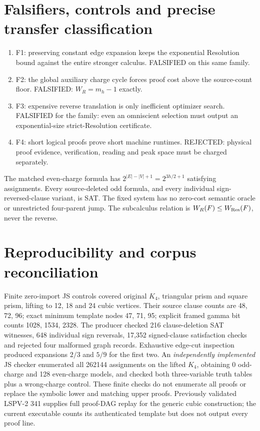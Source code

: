 \documentclass[11pt]{article}
\begin{document}
\section*{Falsifiers, controls and precise transfer classification}
\begin{enumerate}
\item[] F1: preserving constant edge expansion keeps the exponential Resolution bound against the entire stronger calculus. FALSIFIED on this same family.
\item[] F2: the global auxiliary charge cycle forces proof cost above the source-count floor. FALSIFIED: $W_R=m_h-1$ exactly.
\item[] F3: expensive reverse translation is only inefficient optimizer search. FALSIFIED for the family: even an omniscient selection must output an exponential-size strict-Resolution certificate.
\item[] F4: short logical proofs prove short machine runtimes. REJECTED: physical proof evidence, verification, reading and peak space must be charged separately.
\end{enumerate}
The matched even-charge formula has $2^{|E|-|V|+1}=2^{3h/2+1}$ satisfying assignments. Every source-deleted odd formula, and every individual sign-reversed-clause variant, is SAT. The fixed system has no zero-cost semantic oracle or unrestricted four-parent jump. The subcalculus relation is $W_R(F)\le W_{\rm Res}(F)$, never the reverse.

\section*{Reproducibility and corpus reconciliation}
Finite zero-import JS controls covered original $K_4$, triangular prism and square prism, lifting to 12, 18 and 24 cubic vertices. Their source clause counts are 48, 72, 96; exact minimum template nodes 47, 71, 95; explicit framed gamma bit counts 1028, 1534, 2328. The producer checked 216 clause-deletion SAT witnesses, 648 individual sign reversals, 17,352 signed-clause satisfaction checks and rejected four malformed graph records. Exhaustive edge-cut inspection produced expansions $2/3$ and $5/9$ for the first two. An \emph{independently implemented} JS checker enumerated all 262144 assignments on the lifted $K_4$, obtaining 0 odd-charge and 128 even-charge models, and checked both three-variable truth tables plus a wrong-charge control. These finite checks do not enumerate all proofs or replace the symbolic lower and matching upper proofs. Previously validated LSPV-2 341 supplies full proof-DAG replay for the generic cubic construction; the current executable counts its authenticated template but does not output every proof line.
\end{document}
